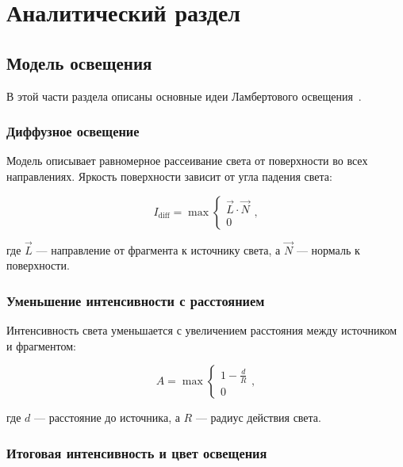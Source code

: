 \chapter{Аналитический раздел}

\section{Модель освещения}

В этой части раздела описаны основные идеи Ламбертового освещения~\cite{OpenGL_DevidVolf}.

\subsection*{Диффузное освещение}

Модель описывает равномерное рассеивание света от поверхности во всех направлениях.
Яркость поверхности зависит от угла падения света:

\begin{equation}
    \label{equ:diffuse_lambert}
    I_{\text{diff}} = \max
    \begin{cases}
        \vec{L} \cdot \vec{N} \\
        0
    \end{cases},
\end{equation}

\noindent где \( \vec{L} \) — направление от фрагмента к источнику света,
а \( \vec{N} \) — нормаль к поверхности.

\subsection*{Уменьшение интенсивности с расстоянием}

Интенсивность света уменьшается с увеличением расстояния между источником и фрагментом:

\begin{equation}
    \label{equ:atteunation_lambert}
    A = \max
    \begin{cases}
        1 - \frac{d}{R} \\
        0
    \end{cases},
\end{equation}

\noindent где \( d \) — расстояние до источника, а \( R \) — радиус действия света.

\subsection*{Итоговая интенсивность и цвет освещения}

